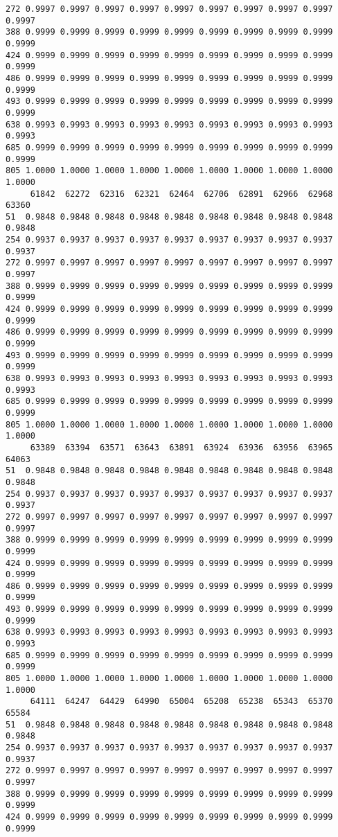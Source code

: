 \documentclass[
]{report}
\begin{document}
\begin{verbatim}
272 0.9997 0.9997 0.9997 0.9997 0.9997 0.9997 0.9997 0.9997 0.9997 0.9997
388 0.9999 0.9999 0.9999 0.9999 0.9999 0.9999 0.9999 0.9999 0.9999 0.9999
424 0.9999 0.9999 0.9999 0.9999 0.9999 0.9999 0.9999 0.9999 0.9999 0.9999
486 0.9999 0.9999 0.9999 0.9999 0.9999 0.9999 0.9999 0.9999 0.9999 0.9999
493 0.9999 0.9999 0.9999 0.9999 0.9999 0.9999 0.9999 0.9999 0.9999 0.9999
638 0.9993 0.9993 0.9993 0.9993 0.9993 0.9993 0.9993 0.9993 0.9993 0.9993
685 0.9999 0.9999 0.9999 0.9999 0.9999 0.9999 0.9999 0.9999 0.9999 0.9999
805 1.0000 1.0000 1.0000 1.0000 1.0000 1.0000 1.0000 1.0000 1.0000 1.0000
     61842  62272  62316  62321  62464  62706  62891  62966  62968  63360
51  0.9848 0.9848 0.9848 0.9848 0.9848 0.9848 0.9848 0.9848 0.9848 0.9848
254 0.9937 0.9937 0.9937 0.9937 0.9937 0.9937 0.9937 0.9937 0.9937 0.9937
272 0.9997 0.9997 0.9997 0.9997 0.9997 0.9997 0.9997 0.9997 0.9997 0.9997
388 0.9999 0.9999 0.9999 0.9999 0.9999 0.9999 0.9999 0.9999 0.9999 0.9999
424 0.9999 0.9999 0.9999 0.9999 0.9999 0.9999 0.9999 0.9999 0.9999 0.9999
486 0.9999 0.9999 0.9999 0.9999 0.9999 0.9999 0.9999 0.9999 0.9999 0.9999
493 0.9999 0.9999 0.9999 0.9999 0.9999 0.9999 0.9999 0.9999 0.9999 0.9999
638 0.9993 0.9993 0.9993 0.9993 0.9993 0.9993 0.9993 0.9993 0.9993 0.9993
685 0.9999 0.9999 0.9999 0.9999 0.9999 0.9999 0.9999 0.9999 0.9999 0.9999
805 1.0000 1.0000 1.0000 1.0000 1.0000 1.0000 1.0000 1.0000 1.0000 1.0000
     63389  63394  63571  63643  63891  63924  63936  63956  63965  64063
51  0.9848 0.9848 0.9848 0.9848 0.9848 0.9848 0.9848 0.9848 0.9848 0.9848
254 0.9937 0.9937 0.9937 0.9937 0.9937 0.9937 0.9937 0.9937 0.9937 0.9937
272 0.9997 0.9997 0.9997 0.9997 0.9997 0.9997 0.9997 0.9997 0.9997 0.9997
388 0.9999 0.9999 0.9999 0.9999 0.9999 0.9999 0.9999 0.9999 0.9999 0.9999
424 0.9999 0.9999 0.9999 0.9999 0.9999 0.9999 0.9999 0.9999 0.9999 0.9999
486 0.9999 0.9999 0.9999 0.9999 0.9999 0.9999 0.9999 0.9999 0.9999 0.9999
493 0.9999 0.9999 0.9999 0.9999 0.9999 0.9999 0.9999 0.9999 0.9999 0.9999
638 0.9993 0.9993 0.9993 0.9993 0.9993 0.9993 0.9993 0.9993 0.9993 0.9993
685 0.9999 0.9999 0.9999 0.9999 0.9999 0.9999 0.9999 0.9999 0.9999 0.9999
805 1.0000 1.0000 1.0000 1.0000 1.0000 1.0000 1.0000 1.0000 1.0000 1.0000
     64111  64247  64429  64990  65004  65208  65238  65343  65370  65584
51  0.9848 0.9848 0.9848 0.9848 0.9848 0.9848 0.9848 0.9848 0.9848 0.9848
254 0.9937 0.9937 0.9937 0.9937 0.9937 0.9937 0.9937 0.9937 0.9937 0.9937
272 0.9997 0.9997 0.9997 0.9997 0.9997 0.9997 0.9997 0.9997 0.9997 0.9997
388 0.9999 0.9999 0.9999 0.9999 0.9999 0.9999 0.9999 0.9999 0.9999 0.9999
424 0.9999 0.9999 0.9999 0.9999 0.9999 0.9999 0.9999 0.9999 0.9999 0.9999

\end{verbatim}
\end{document}
